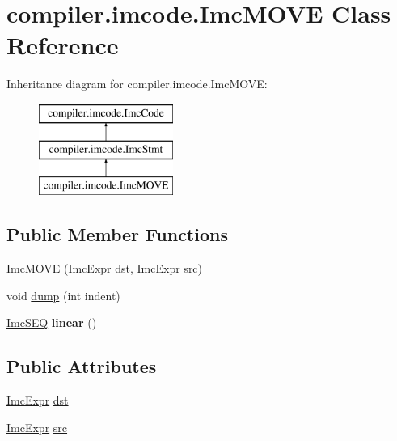 \hypertarget{classcompiler_1_1imcode_1_1_imc_m_o_v_e}{}\section{compiler.\+imcode.\+Imc\+M\+O\+VE Class Reference}
\label{classcompiler_1_1imcode_1_1_imc_m_o_v_e}
Inheritance diagram for compiler.\+imcode.\+Imc\+M\+O\+VE\+:\begin{figure}[H]
\begin{center}
\leavevmode
\includegraphics[height=3.000000cm]{classcompiler_1_1imcode_1_1_imc_m_o_v_e}
\end{center}
\end{figure}
\subsection*{Public Member Functions}
\begin{DoxyCompactItemize}
\item 
\hyperlink{classcompiler_1_1imcode_1_1_imc_m_o_v_e_aa5f288629e76da6d228d7f2065266043}{Imc\+M\+O\+VE} (\hyperlink{classcompiler_1_1imcode_1_1_imc_expr}{Imc\+Expr} \hyperlink{classcompiler_1_1imcode_1_1_imc_m_o_v_e_afff762f9e899ac9d444f01b18d5df5e8}{dst}, \hyperlink{classcompiler_1_1imcode_1_1_imc_expr}{Imc\+Expr} \hyperlink{classcompiler_1_1imcode_1_1_imc_m_o_v_e_a58754ad36446fb303d6fa1207c6110b3}{src})
\item 
void \hyperlink{classcompiler_1_1imcode_1_1_imc_m_o_v_e_a3ffea72b3490bb79245f8c9a311cd4e4}{dump} (int indent)
\item 
\mbox{\label{classcompiler_1_1imcode_1_1_imc_m_o_v_e_a3afa196991ad616bc6c56aa87642871f}} 
\hyperlink{classcompiler_1_1imcode_1_1_imc_s_e_q}{Imc\+S\+EQ} {\bfseries linear} ()
\end{DoxyCompactItemize}
\subsection*{Public Attributes}
\begin{DoxyCompactItemize}
\item 
\hyperlink{classcompiler_1_1imcode_1_1_imc_expr}{Imc\+Expr} \hyperlink{classcompiler_1_1imcode_1_1_imc_m_o_v_e_afff762f9e899ac9d444f01b18d5df5e8}{dst}
\item 
\hyperlink{classcompiler_1_1imcode_1_1_imc_expr}{Imc\+Expr} \hyperlink{classcompiler_1_1imcode_1_1_imc_m_o_v_e_a58754ad36446fb303d6fa1207c6110b3}{src}
\end{DoxyCompactItemize}



